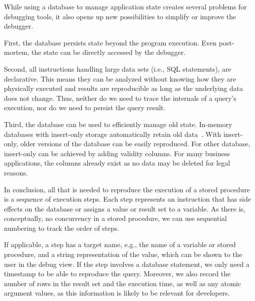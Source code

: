 \documentclass[english]{sig-alternate-05-2015}
\newcommand{\todo}[2][]{\pdfmargincomment[author={#1}]{#2}}
\begin{document}
While using a database to manage application state creates several problems for debugging tools, it also opens up new possibilities to simplify or improve the debugger.

First, the database persists state beyond the program execution.
Even post-mortem, the state can be directly accessed by the debugger.

Second, all instructions handling large data sets (i.e., SQL statements), are declarative.
This means they can be analyzed without knowing how they are physically executed and results are reproducible as long as the underlying data does not change.
Thus, neither do we need to trace the internals of a query's execution, nor do we need to persist the query result.
\todo{MP: This is not clear to me, yet.}

Third, the database can be used to efficiently manage old state.
In-memory databases with insert-only storage automatically retain old data~\cite{Plattner2009Acd}.
With insert-only, older versions of the database can be easily reproduced.
For other database, insert-only can be achieved by adding validity columns.
For many business applications, the columns already exist as no data may be deleted for legal reasons.

In conclusion, all that is needed to reproduce the execution of a stored procedure is a sequence of execution steps.
Each step represents an instruction that has side effects on the database or assigns a value or result set to a variable.
As there is, conceptually, no concurrency in a stored procedure, we can use sequential numbering to track the order of steps.

If applicable, a step has a target name, e.g., the name of a variable or stored procedure, and a string representation of the value, which can be shown to the user in the debug view.
If the step involves a database statement, we only need a timestamp to be able to reproduce the query.
Moreover, we also record the number of rows in the result set and the execution time, as well as any atomic argument values, as this information is likely to be relevant for developers.

\end{document}
